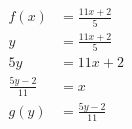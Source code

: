 \documentclass[preview,varwidth ,multi]{standalone}
\begin{document}
\preview
$\begin{aligned}
f(x) &= \frac{11x + 2}{5} \\
y &= \frac{11x + 2}{5} \\
5y &= 11x + 2\\
\frac{5y - 2}{11} &= x\\
g(y) &= \frac{5y - 2}{11}\\
\end{aligned}$
\endpreview
\end{document}
